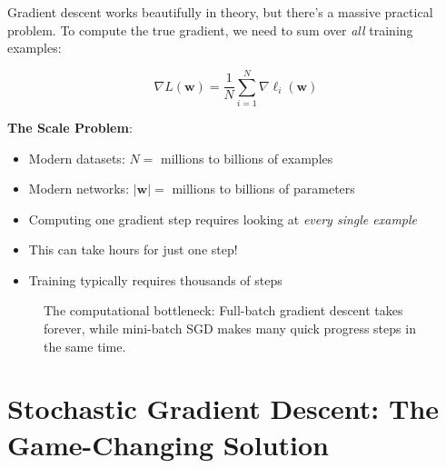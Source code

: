 \documentclass[11pt]{article}
\newcommand{\w}{\mathbf{w}}
\newcommand{\x}{\mathbf{x}}
\begin{document}
Gradient descent works beautifully in theory, but there's a massive practical problem. To compute the true gradient, we need to sum over \textit{all} training examples:

\begin{equation}
\nabla L(\w) = \frac{1}{N} \sum_{i=1}^{N} \nabla \ell_i(\w)
\end{equation}

\textbf{The Scale Problem}:
\begin{itemize}
\item Modern datasets: $N =$ millions to billions of examples
\item Modern networks: $|\w| =$ millions to billions of parameters
\item Computing one gradient step requires looking at \textit{every single example}
\item This can take hours for just one step!
\item Training typically requires thousands of steps
\end{itemize}

\begin{figure}[h!]
\centering
{}
\caption{The computational bottleneck: Full-batch gradient descent takes forever, while mini-batch SGD makes many quick progress steps in the same time.}
\label{fig:computational_bottleneck}
\end{figure}

\section{Stochastic Gradient Descent: The Game-Changing Solution}
\end{document}
